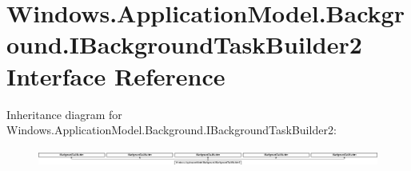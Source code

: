 \hypertarget{interface_windows_1_1_application_model_1_1_background_1_1_i_background_task_builder2}{}\section{Windows.\+Application\+Model.\+Background.\+I\+Background\+Task\+Builder2 Interface Reference}
\label{interface_windows_1_1_application_model_1_1_background_1_1_i_background_task_builder2}
Inheritance diagram for Windows.\+Application\+Model.\+Background.\+I\+Background\+Task\+Builder2\+:\begin{figure}[H]
\begin{center}
\leavevmode
\includegraphics[height=0.571429cm]{interface_windows_1_1_application_model_1_1_background_1_1_i_background_task_builder2}
\end{center}
\end{figure}
